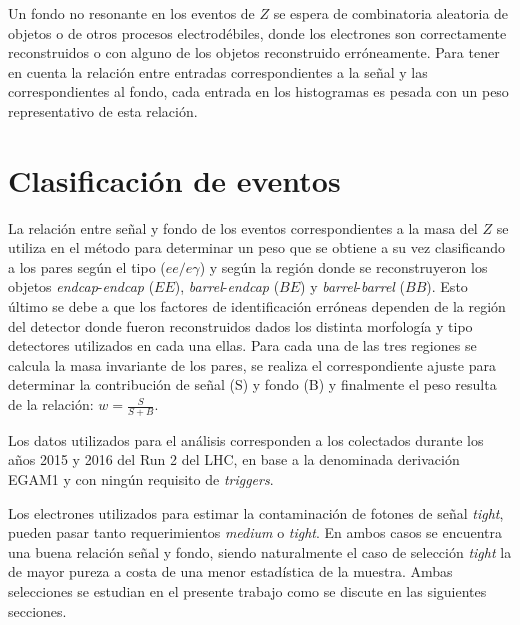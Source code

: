 Un fondo no resonante en los eventos de $Z$ se espera de combinatoria aleatoria de objetos o de otros procesos electrodébiles, donde los electrones son correctamente reconstruidos o con alguno de los objetos reconstruido erróneamente. Para tener en cuenta la relación entre entradas correspondientes a la señal y las correspondientes al fondo, cada entrada en los histogramas es pesada con un peso representativo de esta relación.



\section{Clasificación de eventos}

La relación entre señal y fondo de los eventos correspondientes a la masa del $Z$ se utiliza en el método para determinar un peso que se obtiene a su vez clasificando a los pares según el tipo ($ee/e\gamma$) y según la región donde se reconstruyeron los objetos \textit{endcap}-\textit{endcap} ($EE$), \textit{barrel}-\textit{endcap} ($BE$) y \textit{barrel}-\textit{barrel} ($BB$). Esto último se debe a que los factores de identificación erróneas dependen de la región del detector donde fueron reconstruidos dados los distinta morfología y tipo detectores utilizados en cada una ellas. Para cada una de las tres regiones se calcula la masa invariante de los pares, se realiza el correspondiente ajuste para determinar la contribución de señal (S) y fondo (B) y finalmente el peso resulta de la relación: $w=\frac{S}{S+B}$. 

Los datos utilizados para el análisis corresponden a los colectados durante los años 2015 y 2016 del Run 2 del LHC, en base a la denominada derivación EGAM1 y con ningún requisito de \textit{triggers}.

Los electrones utilizados para estimar la contaminación de fotones de señal \textit{tight}, pueden pasar tanto requerimientos  \textit{medium} o \textit{tight}. En ambos casos se encuentra una buena relación señal y fondo, siendo naturalmente el caso de selección \textit{tight} la de mayor pureza a costa de una menor estadística de la muestra. Ambas selecciones se estudian en el presente trabajo como se discute en las siguientes secciones.

